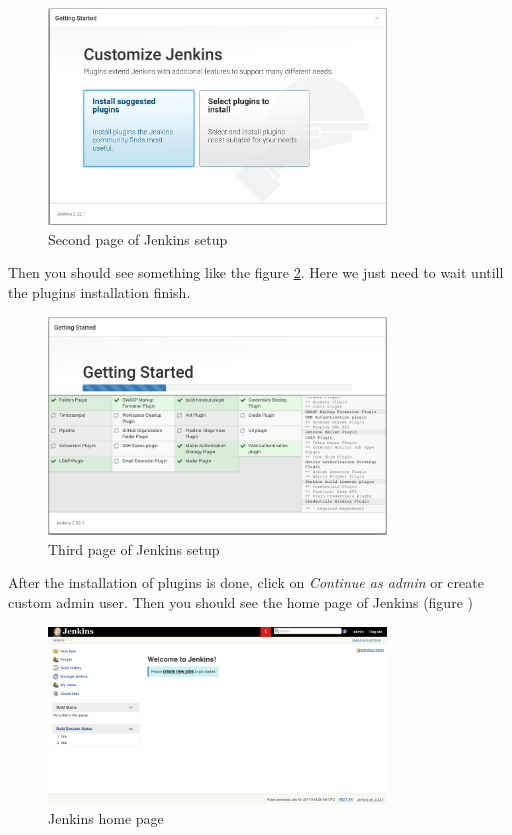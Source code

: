\begin{figure}[H]
	\centering
    \includegraphics[width=0.8\textwidth]{grafiken/jenkins-02}
    \caption{Second page of Jenkins setup}
    \label{fig:jenkins-02}
\end{figure}

Then you should see something like the figure \ref{fig:jenkins-03}. Here we just need to wait untill the plugins installation finish.

\begin{figure}[H]
	\centering
    \includegraphics[width=0.8\textwidth]{grafiken/jenkins-03}
    \caption{Third page of Jenkins setup}
    \label{fig:jenkins-03}
\end{figure}

After the installation of plugins is done, click on \textit{Continue as admin} or create custom admin user. Then you should see the home page of Jenkins (figure )

\begin{figure}[H]
	\centering
    \includegraphics[width=0.8\textwidth]{grafiken/jenkins-04}
    \caption{Jenkins home page}
    \label{fig:jenkins-04}
\end{figure}

